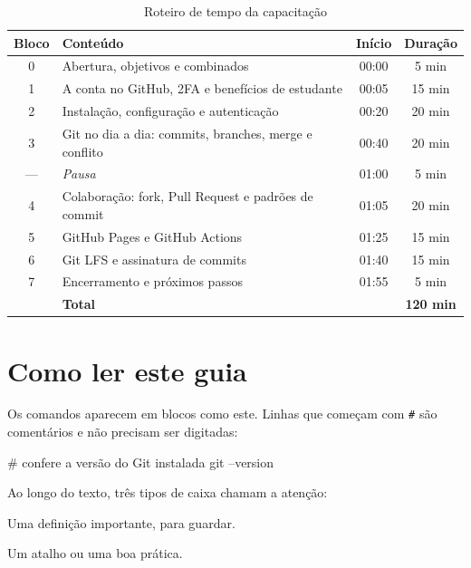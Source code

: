 \begin{table}[H]
  \centering
  \caption{Roteiro de tempo da capacitação}
  \label{tab:roteiro}
  \begin{tabularx}{\textwidth}{@{}c X c c@{}}
    \toprule
    \textbf{Bloco} & \textbf{Conteúdo} & \textbf{Início} & \textbf{Duração} \\
    \midrule
    0 & Abertura, objetivos e combinados & 00:00 & 5 min \\
    1 & A conta no GitHub, 2FA e benefícios de estudante & 00:05 & 15 min \\
    2 & Instalação, configuração e autenticação & 00:20 & 20 min \\
    3 & Git no dia a dia: commits, branches, merge e conflito & 00:40 & 20 min \\
    — & \textit{Pausa} & 01:00 & 5 min \\
    4 & Colaboração: fork, Pull Request e padrões de commit & 01:05 & 20 min \\
    5 & GitHub Pages e GitHub Actions & 01:25 & 15 min \\
    6 & Git LFS e assinatura de commits & 01:40 & 15 min \\
    7 & Encerramento e próximos passos & 01:55 & 5 min \\
    \midrule
      & \textbf{Total} & & \textbf{120 min} \\
    \bottomrule
  \end{tabularx}
\end{table}

\section{Como ler este guia}

Os comandos aparecem em blocos como este. Linhas que começam com \texttt{\#}
são comentários e não precisam ser digitadas:

\begin{bashcode}
# confere a versão do Git instalada
git --version
\end{bashcode}

Ao longo do texto, três tipos de caixa chamam a atenção:

\begin{conceito}
Uma definição importante, para guardar.
\end{conceito}

\begin{dica}
Um atalho ou uma boa prática.
\end{dica}

